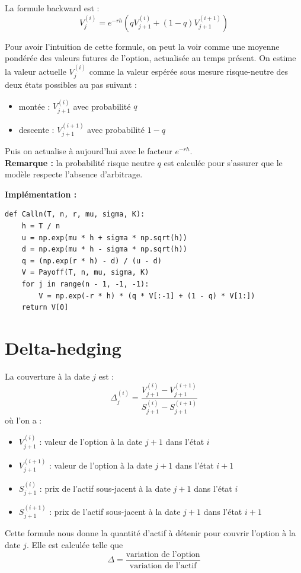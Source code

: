 \documentclass[a4paper,11pt]{article}
\begin{document}
\noindent La formule backward est :
\[
\boxed{V_j^{(i)} = e^{-r h} \left( q V_{j+1}^{(i)} + (1 - q) V_{j+1}^{(i+1)} \right)}
\]

Pour avoir l'intuition de cette formule, on peut la voir comme une moyenne pondérée des valeurs futures de l'option, actualisée au temps présent. On estime la valeur actuelle \(V_j^{(i)}\) comme la valeur espérée sous mesure risque-neutre des deux états possibles au pas suivant :
\begin{itemize}
    \item montée : \(V_{j+1}^{(i)}\) avec probabilité \(q\)
    \item descente : \(V_{j+1}^{(i+1)}\) avec probabilité \(1 - q\)
\end{itemize}
Puis on actualise à aujourd'hui avec le facteur \(e^{-r h}\).\\
\textbf{Remarque :} la probabilité risque neutre \(q\) est calculée pour s'assurer que le modèle respecte l'absence d'arbitrage.\newpage

\textbf{Implémentation :}
\begin{lstlisting}
def Calln(T, n, r, mu, sigma, K):
    h = T / n
    u = np.exp(mu * h + sigma * np.sqrt(h))
    d = np.exp(mu * h - sigma * np.sqrt(h))
    q = (np.exp(r * h) - d) / (u - d)
    V = Payoff(T, n, mu, sigma, K)
    for j in range(n - 1, -1, -1):
        V = np.exp(-r * h) * (q * V[:-1] + (1 - q) * V[1:])
    return V[0]
\end{lstlisting}

\section{Delta-hedging}

La couverture à la date $j$ est :
\[
\boxed{\Delta_j^{(i)} = \frac{V_{j+1}^{(i)} - V_{j+1}^{(i+1)}}{S_{j+1}^{(i)} - S_{j+1}^{(i+1)}}}
\]
où l'on a :
\begin{itemize} 
    \item \(V_{j+1}^{(i)}\) : valeur de l'option à la date $j+1$ dans l'état $i$
    \item \(V_{j+1}^{(i+1)}\) : valeur de l'option à la date $j+1$ dans l'état $i+1$
    \item \(S_{j+1}^{(i)}\) : prix de l'actif sous-jacent à la date $j+1$ dans l'état $i$
    \item \(S_{j+1}^{(i+1)}\) : prix de l'actif sous-jacent à la date $j+1$ dans l'état $i+1$
\end{itemize}
Cette formule nous donne la quantité d'actif à détenir pour couvrir l'option à la date $j$. Elle est calculée telle que \[\Delta = \frac{\text{variation de l'option}}{\text{variation de l'actif}}\]\\
\end{document}
